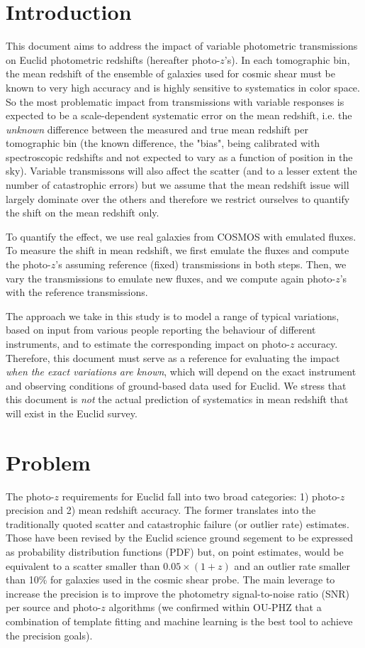 \documentclass[11pt]{article}
\begin{document}
\section{Introduction}\label{introduction}

This document aims to address the impact of variable photometric
transmissions on Euclid photometric redshifts (hereafter photo-\(z\)'s).
In each tomographic bin, the mean redshift of the ensemble of galaxies
used for cosmic shear must be known to very high accuracy and is highly
sensitive to systematics in color space. So the most problematic impact
from transmissions with variable responses is expected to be a
scale-dependent systematic error on the mean redshift, i.e. the
\emph{unknown} difference between the measured and true mean redshift
per tomographic bin (the known difference, the "bias", being calibrated
with spectroscopic redshifts and not expected to vary as a function of
position in the sky). Variable transmissons will also affect the scatter
(and to a lesser extent the number of catastrophic errors) but we assume
that the mean redshift issue will largely dominate over the others and
therefore we restrict ourselves to quantify the shift on the mean
redshift only.

To quantify the effect, we use real galaxies from COSMOS with emulated
fluxes. To measure the shift in mean redshift, we first emulate the
fluxes and compute the photo-\(z\)'s assuming reference (fixed)
transmissions in both steps. Then, we vary the transmissions to emulate
new fluxes, and we compute again photo-\(z\)'s with the reference
transmissions.

The approach we take in this study is to model a range of typical
variations, based on input from various people reporting the behaviour
of different instruments, and to estimate the corresponding impact on
photo-\(z\) accuracy. Therefore, this document must serve as a reference
for evaluating the impact \emph{when the exact variations are known},
which will depend on the exact instrument and observing conditions of
ground-based data used for Euclid. We stress that this document is
\emph{not} the actual prediction of systematics in mean redshift that
will exist in the Euclid survey.

\section{Problem}\label{problem}

The photo-\(z\) requirements for Euclid fall into two broad categories:
1) photo-\(z\) precision and 2) mean redshift accuracy. The former
translates into the traditionally quoted scatter and catastrophic
failure (or outlier rate) estimates. Those have been revised by the
Euclid science ground segement to be expressed as probability
distribution functions (PDF) but, on point estimates, would be
equivalent to a scatter smaller than \(0.05\times(1+z)\) and an outlier
rate smaller than 10\% for galaxies used in the cosmic shear probe. The
main leverage to increase the precision is to improve the photometry
signal-to-noise ratio (SNR) per source and photo-\(z\) algorithms (we
confirmed within OU-PHZ that a combination of template fitting and
machine learning is the best tool to achieve the precision goals).
\end{document}
